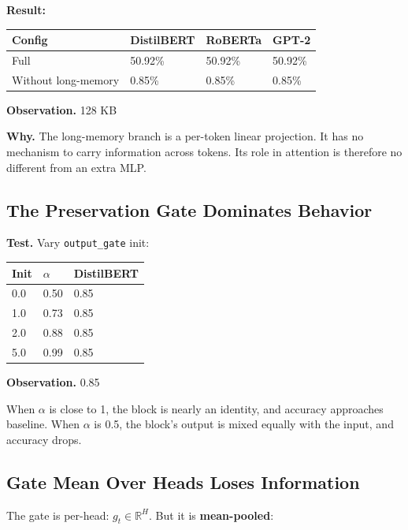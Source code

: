 \textbf{Result:}

\begin{table}[H]
\centering
\small
\begin{tabular}{llll}
\toprule
\textbf{Config} & \textbf{DistilBERT} & \textbf{RoBERTa} & \textbf{GPT-2} \\
\midrule
Full & 50.92\% & 50.92\% & 50.92\% \\
Without long-memory & 0.85\% & 0.85\% & 0.85\% \\
\bottomrule
\end{tabular}
\end{table}

\textbf{Observation.} 128 KB

\textbf{Why.} The long-memory branch is a per-token linear projection. It has no 
mechanism to carry information across tokens. Its role in attention is 
therefore no different from an extra MLP.

\subsection{The Preservation Gate Dominates Behavior}

\textbf{Test.} Vary \texttt{output\_gate} init:

\begin{table}[H]
\centering
\small
\begin{tabular}{lll}
\toprule
\textbf{Init} & \textbf{$\alpha$} & \textbf{DistilBERT} \\
\midrule
0.0 & 0.50 & 0.85 \\
1.0 & 0.73 & 0.85 \\
2.0 & 0.88 & 0.85 \\
5.0 & 0.99 & 0.85 \\
\bottomrule
\end{tabular}
\end{table}

\textbf{Observation.} 0.85

When $\alpha$ is close to 1, the block is nearly an identity, and accuracy 
approaches baseline. When $\alpha$ is 0.5, the block's output is mixed equally 
with the input, and accuracy drops.

\subsection{Gate Mean Over Heads Loses Information}

The gate is per-head: $g_t \in \mathbb{R}^H$. But it is \textbf{mean-pooled}:

